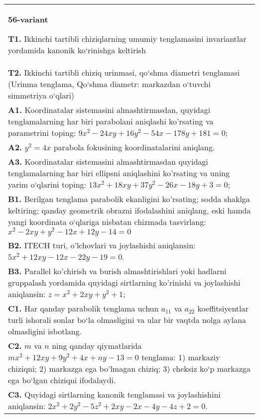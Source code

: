 \documentclass{article}
\begin{document}
\begin{tabular}{m{17cm}}
\textbf{56-variant}
\newline

\textbf{T1.} Ikkinchi tartibli chiziqlarning umumiy tenglamasini invariantlar yordamida kanonik ko‘rinishga keltirish \\
\textbf{T2.} Ikkinchi tartibli chiziq urinmasi, qo‘shma diametri tenglamasi (Urinma tenglama, Qo‘shma diametr: markazdan o‘tuvchi simmetriya o‘qlari) \\
\textbf{A1.} Koordinatalar sistemasini almashtirmasdan, quyidagi tenglamalarning har biri parabolani aniqlashi ko'rsating va parametrini toping: $9 x^2-24 x y+16 y^2-54 x-178 y+181=0$; \\
\textbf{A2.} $y^2=4 x$ parabola fokusining koordinatalarini aniqlang. \\
\textbf{A3.} Koordinatalar sistemasini almashtirmasdan quyidagi tenglamalarning har biri ellipsni aniqlashini ko'rsating va uning yarim o‘qlarini toping: $13 x^2+18 x y+37 y^2-26 x-18 y+3=0$; \\
\textbf{B1.} Berilgan tenglama parabolik ekanligini ko'rsating; sodda shaklga keltiring; qanday geometrik obrazni ifodalashini aniqlang, eski hamda yangi koordinata o‘qlariga nisbatan chizmada tasvirlang: $x^2-2 x y+y^2-12 x+12 y-14=0$ \\
\textbf{B2.} ITECH turi, o'lchovlari va joylashishi aniqlansin: $5 x^2+12 x y-12 x-22 y-19=0$. \\
\textbf{B3.} Parallel ko'chirish va burish almashtirishlari yoki hadlarni gruppalash yordamida quyidagi sirtlarning ko'rinishi va joylashishi aniqlansin: $z=x^2+2 x y+y^2+1$; \\
\textbf{C1.} Har qanday parabolik tenglama uchun $a_{11}$ va $a_{22}$ koeffitsiyentlar turli ishorali sonlar bo‘la olmasligini va ular bir vaqtda nolga aylana olmasligini isbotlang. \\
\textbf{C2.} $m$ va $n$ ning qanday qiymatlarida $m x^2+12 x y+9 y^2+4 x+n y-13=0$ tenglama: 1) markaziy chiziqni; 2) markazga ega bo'lmagan chiziq; 3) cheksiz ko‘p markazga ega bo‘lgan chiziqni ifodalaydi. \\
\textbf{C3.} Quyidagi sirtlarning kanonik tenglamasi va joylashishini aniqlansin: $2 x^2+2 y^2-5 z^2+2 x y-2 x-4 y-4 z+2=0$. \\

\end{tabular}
\vspace{1cm}
\end{document}
